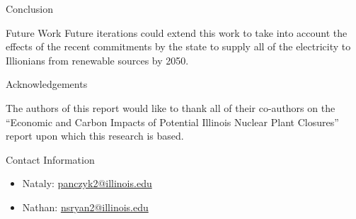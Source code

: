 \documentclass[final]{beamer}
\newlength{\onecolwid}
\newlength{\threecolwid}
\begin{document}
\begin{frame}[t]
\begin{columns}[t,totalwidth=\threecolwid]
\begin{column}{\onecolwid}
\begin{block}{Conclusion}
\end{block}

\begin{alertblock}{Future Work }
	Future iterations could extend this work to take into account the effects of the recent commitments by the state to supply all of the electricity to Illionians from renewable sources by 2050.

\end{alertblock}




\begin{block}{Acknowledgements}
	
	The authors of this report would like to thank all of their co-authors on the “Economic and Carbon Impacts of Potential Illinois Nuclear Plant Closures” report upon which this research is based.
	
\end{block}



\begin{alertblock}{Contact Information}
	\begin{itemize}
		\item Nataly: \href{mailto:panczyk2@illinois.edu}{panczyk2@illinois.edu}
		\item Nathan: \href{mailto:nsryan2@illinois.edu}{nsryan2@illinois.edu}
	\end{itemize}
	

\end{alertblock}
\end{column}
\end{columns}
\end{frame}
\end{document}
